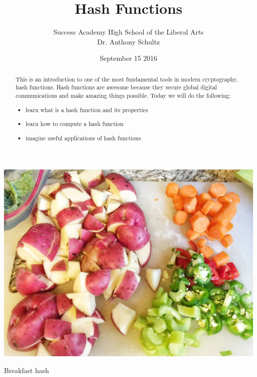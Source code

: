 \documentclass{tufte-handout}
\title{Hash Functions }
\author[Packer]{Success Academy High School of the Liberal Arts\\Dr. Anthony Schultz}
\date{September 15 2016} %
\begin{document}
\maketitle%


\begin{marginfigure}[-40 pt]%
  \includegraphics[width=\linewidth]{hash.jpg}
  \caption{Breakfast hash }
  \label{fig:marginfig}
\end{marginfigure}



\begin{abstract}
\noindent
This is an introduction to one of the most fundamental tools in modern cryptography, hash functions.  Hash functions are awesome because they secure global digital communications and make amazing things possible.   Today we will do the following: 
\begin{itemize}
\item learn what is a hash function and its properties
\item learn how to compute a hash function
 \item imagine useful applications of hash functions
 \end{itemize} \end{abstract}
\end{document}
